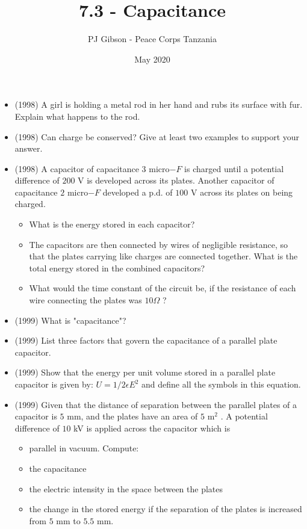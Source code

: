 \documentclass{article}
\title{\textbf{7.3 - Capacitance}}
\author{PJ Gibson - Peace Corps Tanzania}
\date{May 2020}
\begin{document}
\maketitle

\begin{itemize}
\item (1998)  A girl is holding a metal rod in her hand and rubs its surface with fur. Explain what happens to the rod.
\item (1998)  Can charge be conserved? Give at least two examples to support your answer.
\item (1998)  A capacitor of capacitance $ 3$ micro$ -F$ is charged until a potential difference of $ 200$ V is developed across its plates. Another capacitor of capacitance $ 2$ micro$ -F$ developed a p.d. of $ 100$ V across its plates on being charged.
 \begin{itemize}
\item What is the energy stored in each capacitor?
\item The capacitors are then connected by wires of negligible resistance, so that the plates carrying like charges are connected together. What is the total energy stored in the combined capacitors?
\item What would the time constant of the circuit be, if the resistance of each wire connecting the plates was $ 10\Omega $ ?
\end{itemize}
\item (1999)  What is "capacitance"?
\item (1999)  List three factors that govern the capacitance of a parallel plate capacitor.
\item (1999)  Show that the energy per unit volume stored in a parallel plate capacitor is given by: $ U=1/2\epsilon E^{2}$ and define all the symbols in this equation.
\item (1999)  Given that the distance of separation between the parallel plates of a capacitor is $ 5$ mm, and the plates have an area of $ 5$ m$ ^{2}$ . A potential difference of $ 10$ kV is applied across the capacitor which is
 \begin{itemize}
\item parallel in vacuum. Compute:
\item the capacitance
\item the electric intensity in the space between the plates
\item the change in the stored energy if the separation of the plates is increased from $ 5$ mm to $ 5.5$ mm.
\end{itemize}

\end{itemize}
\end{document}
